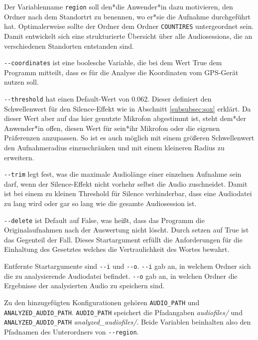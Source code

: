 Der Variablenname \texttt{region} soll den*die Anwender*in dazu motivieren, den Ordner nach dem Standortrt zu benennen, wo er*sie die Aufnahme durchgeführt hat. Optimalerweise sollte der Ordner dem Ordner \texttt{COUNTIRES} untergeordnet sein. Damit entwickelt sich eine strukturierte Übersicht über alle Audiosessions, die an verschiedenen Standorten entstanden sind.

\texttt{-{}-coordinates} ist eine boolesche Variable, die bei dem Wert True dem Programm mitteilt, dass es für die Analyse die Koordinaten vom GPS-Gerät nutzen soll. %

\texttt{-{}-threshold} hat einen Default-Wert von 0.062. Dieser definiert den Schwellenwert für den Silence-Effekt wie in Abschnitt \ref{subsubsec:sox} erklärt. Da dieser Wert aber auf das hier genutzte Mikrofon abgestimmt ist, steht dem*der Anwender*in offen, diesen Wert für sein*ihr Mikrofon oder die eigenen Präferenzen anzupassen. So ist es auch möglich mit einem größeren Schwellenwert den Aufnahmeradius einzuschränken und mit einem kleineren Radius zu erweitern.  

\texttt{-{}-trim} legt fest, was die maximale Audiolänge einer einzelnen Aufnahme sein darf, wenn der Silence-Effekt nicht vorhehr selbst die Audio zuschneidet. Damit ist bei einem zu kleinen Threshold für Silence verhinderbar, dass eine Audiodatei zu lang wird oder gar so lang wie die gesamte Audiosession ist.

\texttt{-{}-delete} ist Default auf False, was heißt, dass das Programm die Originalaufnahmen nach der Auswertung nicht löscht. Durch setzen auf True ist das Gegenteil der Fall. Dieses Startargument erfüllt die Anforderungen für die Einhaltung des Gesetztes welches die Vertraulichkeit des Wortes bewahrt.


Entfernte Startargumente sind \texttt{-{}-i} und \texttt{-{}-o}. 
\texttt{-{}-i} gab an, in welchem Ordner sich die zu analysierende Audiodatei befindet.
\texttt{-{}-o} gab an, in welchen Ordner die Ergebnisse der analysierten Audio zu speichern sind.

Zu den hinzugefügten Konfigurationen gehören \lstinline{AUDIO_PATH} und \lstinline{ANALYZED_AUDIO_PATH}. \lstinline{AUDIO_PATH} speichert die Pfadangaben \textit{audiofiles/} und \lstinline{ANALYZED_AUDIO_PATH} \textit{analyzed\_audiofiles/}. Beide Variablen beinhalten also den Pfadnamen des Unterordners von \texttt{-{}-region}.



